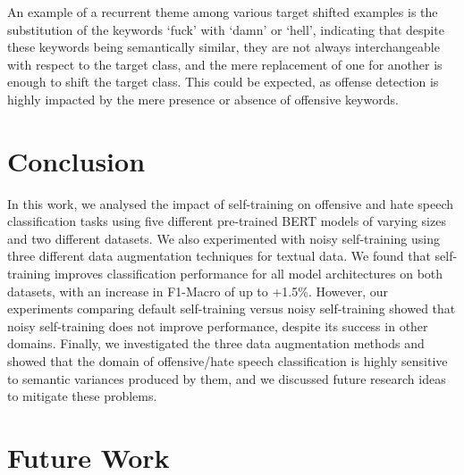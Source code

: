 \documentclass[11pt,a4paper]{article}
\begin{document}
An example of a recurrent theme among various target shifted examples is the substitution of the keywords `fuck' with `damn' or `hell', indicating that despite these keywords being semantically similar, they are not always interchangeable with respect to the target class, and the mere replacement of one for another is enough to shift the target class. This could be expected, as offense detection is highly impacted by the mere presence or absence of offensive keywords.









\section{Conclusion}
In this work, we analysed the impact of self-training on offensive and hate speech classification tasks using five different pre-trained BERT models of varying sizes and two different datasets. We also experimented with noisy self-training using three different data augmentation techniques for textual data. We found that self-training improves classification performance for all model architectures on both datasets, with an increase in F1-Macro of up to +1.5\%. However, our experiments comparing default self-training versus noisy self-training showed that noisy self-training does not improve performance, despite its success in other domains. Finally, we investigated the three data augmentation methods and showed that the domain of offensive/hate speech classification is highly sensitive to semantic variances produced by them, and we discussed future research ideas to mitigate these problems.

\section{Future Work}
\end{document}
